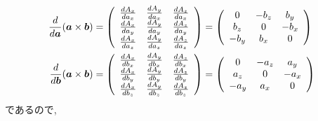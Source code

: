 \begin{align}
   \frac{d}{d \bm{a}} (\bm{a} \times \bm{b})
 &=
   \left(
              \begin{array}{ccc}
               \frac{d A_{x}}{d a_{x}} & \frac{d A_{y}}{d a_{x}} & \frac{d A_{z}}{d a_{x}} \\
               \frac{d A_{x}}{d a_{y}} & \frac{d A_{y}}{d a_{y}} & \frac{d A_{z}}{d a_{y}} \\
               \frac{d A_{x}}{d a_{z}} & \frac{d A_{y}}{d a_{z}} & \frac{d A_{z}}{d a_{z}} \\
              \end{array}
   \right)
 =
  \left(
              \begin{array}{ccc}
                   0  & -b_{z} &  b_{y} \\
                b_{z} &      0 & -b_{x} \\
               -b_{y} &  b_{x} &     0  \\
              \end{array}
  \right)
 \notag
 \\
   \frac{d}{d \bm{b}} (\bm{a} \times \bm{b})
 &=
   \left(
              \begin{array}{ccc}
               \frac{d A_{x}}{d b_{x}} & \frac{d A_{y}}{d b_{x}} & \frac{d A_{z}}{d b_{x}} \\
               \frac{d A_{x}}{d b_{y}} & \frac{d A_{y}}{d b_{y}} & \frac{d A_{z}}{d b_{y}} \\
               \frac{d A_{x}}{d b_{z}} & \frac{d A_{y}}{d b_{z}} & \frac{d A_{z}}{d b_{z}} \\
              \end{array}
   \right)
 =
  \left(
              \begin{array}{ccc}
                   0  & -a_{z} &  a_{y} \\
                a_{z} &      0 & -a_{x} \\
               -a_{y} &  a_{x} &     0  \\
              \end{array}
  \right)
 \notag
\end{align}
であるので, 
